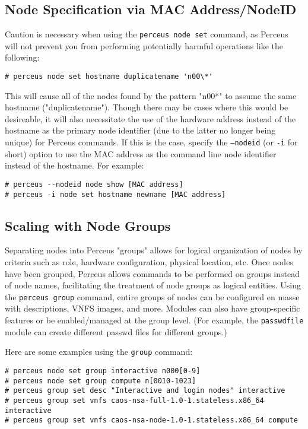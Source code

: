 \documentclass[10pt,letterpaper]{report}
\begin{document}
\subsection{Node Specification via MAC Address/NodeID}

Caution is necessary when using the {\tt perceus node set} command, as Perceus
will not prevent you from performing potentially harmful operations like the
following:

\begin{verbatim}
# perceus node set hostname duplicatename 'n00\*'
\end{verbatim}

This will cause all of the nodes found by the pattern "n00*" to assume the
same hostname ("duplicatename").  Though there may be cases where this would
be desireable, it will also necessitate the use of the hardware address
instead of the hostname as the primary node identifier (due to the latter no
longer being unique) for Perceus commands.  If this is the case, specify the
{\tt --nodeid} (or {\tt -i} for short) option to use the MAC address as the
command line node identifier instead of the hostname.  For example:

\begin{verbatim}
# perceus --nodeid node show [MAC address]
# perceus -i node set hostname newname [MAC address]
\end{verbatim}

\subsection{Scaling with Node Groups}

Separating nodes into Perceus "groups" allows for logical organization of
nodes by criteria such as role, hardware configuration, physical location,
etc.  Once nodes have been grouped, Perceus allows commands to be performed on
groups instead of node names, facilitating the treatment of node groups as
logical entities.  Using the {\tt perceus group} command, entire groups of
nodes can be configured en masse with descriptions, VNFS images, and more.
Modules can also have group-specific features or be enabled/managed at the
group level.  (For example, the {\tt passwdfile} module can create different
passwd files for different groups.)

\noindent Here are some examples using the {\tt group} command:

\begin{verbatim}
# perceus node set group interactive n000[0-9]
# perceus node set group compute n[0010-1023]
# perceus group set desc "Interactive and login nodes" interactive
# perceus group set vnfs caos-nsa-full-1.0-1.stateless.x86_64 interactive
# perceus group set vnfs caos-nsa-node-1.0-1.stateless.x86_64 compute
\end{verbatim}
\end{document}

